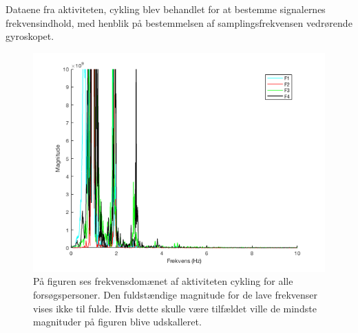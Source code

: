 Dataene fra aktiviteten, cykling blev behandlet for at bestemme signalernes frekvensindhold, med henblik på bestemmelsen af samplingsfrekvensen vedrørende gyroskopet.
\begin{figure}[H]
	\centering
	\includegraphics[scale=0.68]{figures/qBilag/cykling_frekvens}
	\caption{På figuren ses frekvensdomænet af aktiviteten cykling for alle forsøgspersoner. Den fuldstændige magnitude for de lave frekvenser vises ikke til fulde. Hvis dette skulle være tilfældet ville de mindste magnituder på figuren blive udskalleret.}
	\label{fig:Ap_cyklingfrekvens}
\end{figure}

